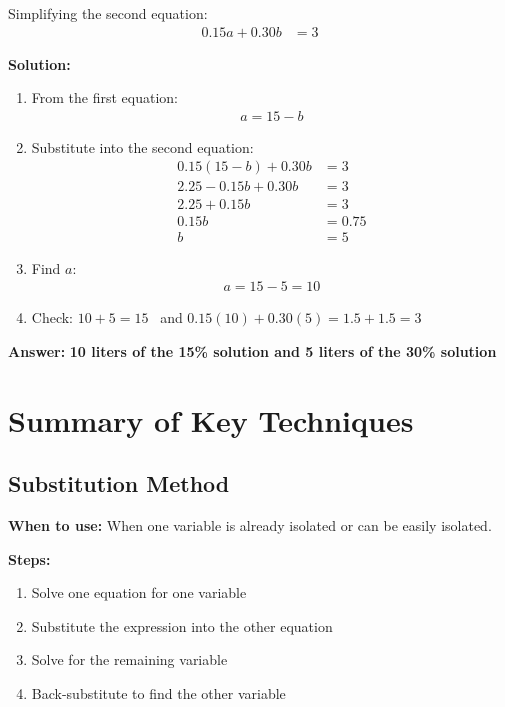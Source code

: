 \documentclass{article}
\begin{document}
Simplifying the second equation:
\begin{align*}
0.15a + 0.30b &= 3
\end{align*}

\textbf{Solution:}

\begin{enumerate}
    \item From the first equation:
    \begin{align*}
        a = 15 - b
    \end{align*}
    \item Substitute into the second equation:
    \begin{align*}
        0.15(15 - b) + 0.30b &= 3 \\
        2.25 - 0.15b + 0.30b &= 3 \\
        2.25 + 0.15b &= 3 \\
        0.15b &= 0.75 \\
        b &= 5
    \end{align*}
    \item Find $a$:
    \begin{align*}
        a = 15 - 5 = 10
    \end{align*}
    \item Check: $10 + 5 = 15$ \,  and $0.15(10) + 0.30(5) = 1.5 + 1.5 = 3$ \, 
\end{enumerate}

\textbf{Answer:} \textbf{10 liters of the 15\% solution and 5 liters of the 30\% solution} \,  

\section{Summary of Key Techniques}

\subsection{Substitution Method}

\textbf{When to use:} When one variable is already isolated or can be easily isolated.

\textbf{Steps:}
\begin{enumerate}
    \item Solve one equation for one variable
    \item Substitute the expression into the other equation
    \item Solve for the remaining variable
    \item Back-substitute to find the other variable
\end{enumerate}
\end{document}
